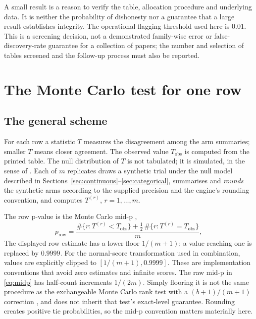 \documentclass[11pt,a4paper]{article}
\begin{document}
A small result is a reason to verify the table, allocation procedure and underlying data. It is neither the probability of dishonesty nor a guarantee that a large result establishes integrity. The operational flagging threshold used here is $0.01$. This is a screening decision, not a demonstrated family-wise error or false-discovery-rate guarantee for a collection of papers; the number and selection of tables screened and the follow-up process must also be reported.

\section{The Monte Carlo test for one row}
\label{sec:row}

\subsection{The general scheme}

For each row a statistic $T$ measures the disagreement among the arm summaries; smaller $T$ means closer agreement. The observed value $T_{\mathrm{obs}}$ is computed from the printed table. The null distribution of $T$ is not tabulated; it is simulated, in the sense of \citet{metropolis1949}. Each of $m$ replicates draws a synthetic trial under the null model described in Sections~\ref{sec:continuous}--\ref{sec:categorical}, summarises and \emph{rounds} the synthetic arms according to the supplied precision and the engine's rounding convention, and computes $T^{(r)}$, $r = 1,\dots,m$.

The row p-value is the Monte Carlo mid-p \citep{lancaster1961,berry1995},
\begin{equation}
p_{\text{row}} = \frac{\#\{r: T^{(r)} < T_{\mathrm{obs}}\} + \tfrac12\,\#\{r: T^{(r)} = T_{\mathrm{obs}}\}}{m},
\label{eq:midp}
\end{equation}
The displayed row estimate has a lower floor $1/(m+1)$; a value reaching one is replaced by $0.9999$. For the normal-score transformation used in combination, values are explicitly clipped to $[1/(m+1),0.9999]$. These are implementation conventions that avoid zero estimates and infinite scores. The raw mid-p in \eqref{eq:midp} has half-count increments $1/(2m)$. Simply flooring it is not the same procedure as the exchangeable Monte Carlo rank test with a $(b+1)/(m+1)$ correction \citep{barnard1963,hope1968,phipson2010}, and does not inherit that test's exact-level guarantee. Rounding creates positive tie probabilities, so the mid-p convention matters materially here.
\end{document}
